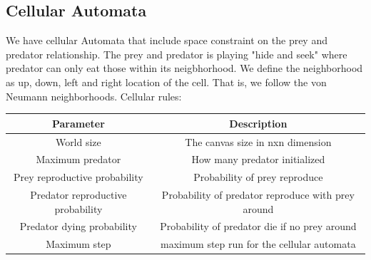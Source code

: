 \documentclass{article}
\begin{document}
\begin{normalsize}
	\subsection{Cellular Automata}
		We have cellular Automata that include space constraint on the prey and predator relationship. The prey and predator is playing "hide and seek" where predator can only eat those within its neigbhorhood. We define the neighborhood as up, down, left and right location of the cell. That is, we follow the von Neumann neighborhoods.
		Cellular rules:
		
		\begin{center}
			\begin{tabular}{ |c|c|} 
				\hline
				Parameter & Description  \\ 
				\hline
				World size & The canvas size in nxn dimension  \\ 
				Maximum predator & How many predator initialized\\ 
				Prey reproductive probability & Probability of prey reproduce \\ 
				Predator reproductive probability & Probability of predator reproduce with prey around \\ 
				Predator dying probability & Probability of predator die if no prey around \\ 
				Maximum step  & maximum step run for the cellular automata \\ 
				\hline
			\end{tabular}
		\end{center}
	

\end{normalsize}
\end{document}
